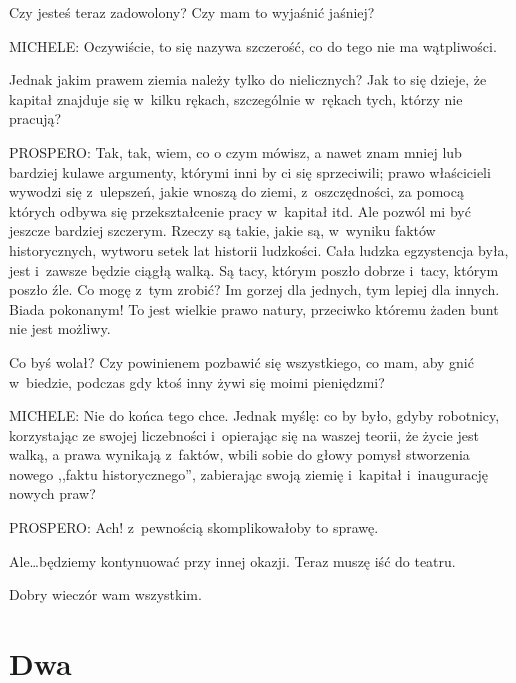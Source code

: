 \documentclass[oneside,polish,11pt,sfheadings]{mwbk}
\begin{document}
 
Czy jesteś teraz zadowolony? Czy mam to wyjaśnić jaśniej? 




 
\noindent MICHELE: Oczywiście, to się nazywa szczerość, co do tego nie ma wątpliwości. 

 
Jednak jakim prawem ziemia należy tylko do nielicznych? Jak to się dzieje, że kapitał znajduje się w~kilku rękach,
szczególnie w~rękach tych, którzy nie pracują? 




 
\noindent PROSPERO: Tak, tak, wiem, co o czym mówisz, a nawet znam mniej lub bardziej kulawe argumenty, którymi inni by ci się
sprzeciwili; prawo właścicieli wywodzi się z~ulepszeń, jakie wnoszą do ziemi, z~oszczędności, za pomocą których odbywa
się przekształcenie pracy w~kapitał itd. Ale pozwól mi być jeszcze bardziej szczerym. Rzeczy są takie, jakie są, w~wyniku faktów historycznych, wytworu setek lat historii ludzkości. Cała ludzka egzystencja była, jest i~zawsze będzie
ciągłą walką. Są tacy, którym poszło dobrze i~tacy, którym poszło źle. Co mogę z~tym zrobić? Im gorzej dla jednych, tym
lepiej dla innych. Biada pokonanym! To jest wielkie prawo natury, przeciwko któremu żaden bunt nie jest możliwy. 

 
Co byś wolał? Czy powinienem pozbawić się wszystkiego, co mam, aby gnić w~biedzie, podczas gdy ktoś inny żywi się moimi
pieniędzmi? 




 
\noindent MICHELE: Nie do końca tego chce. Jednak myślę: co by było, gdyby robotnicy, korzystając ze swojej liczebności i~opierając się na waszej teorii, że życie jest walką, a prawa wynikają z~faktów, wbili sobie do głowy pomysł stworzenia
nowego ,,faktu historycznego'', zabierając swoją ziemię i~kapitał i~inaugurację nowych praw? 




 
\noindent PROSPERO: Ach! z~pewnością skomplikowałoby to sprawę. 

 
Ale\ldots będziemy kontynuować przy innej okazji. Teraz muszę iść do teatru. 

 
Dobry wieczór wam wszystkim. 










\chapter*{Dwa}
\end{document}
